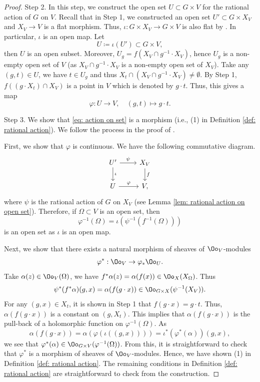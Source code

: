 \documentclass[11pt]{amsart}
\begin{document}
\begin{proof}
    \medskip

Step 2. In this step, we construct the open set $U \subset G \times V$ for the rational action of $G$ on $V$. Recall that in Step 1, we constructed an open set $U' \subset G \times X_{V}$ and $X_{V} \to V$ is a flat morphism. Thus, $\iota: G \times X_{V} \to G \times V$ is also flat by \cite[\href{https://stacks.math.columbia.edu/tag/01UA}{Lemma 01UA}]{stacks-project}. In particular, $\iota$ is an open map. Let
\[
U \coloneqq \iota(U') \subset G \times V,
\] then $U$ is an open subset. Moreover, $U_g= f (X_{V} \cap g^{-1}\cdot X_{V})$, hence $U_g$ is a non-empty open set of $V$ (as $X_{V} \cap g^{-1}\cdot X_{V}$ is a non-empty open set of $X_{V}$). Take any $(g, t)\in U$, we have $t\in U_g$ and thus $X_t \cap (X_{V} \cap g^{-1}\cdot X_{V}) \neq\emptyset$. By Step 1, $f((g\cdot X_t) \cap X_{V})$ is a point in $V$ which is denoted by $g\cdot t$. Thus, this gives a map
\begin{equation}\label{eq: action on set}
\varphi: U \to V, \quad (g, t) \mapsto g\cdot t.
\end{equation} 

Step 3. We show that \eqref{eq: action on set} is a morphism (i.e., (1) in Definition \ref{def: rational action}). We follow the process in the proof of \cite[Proposition 4.2.1]{BSU13}.

First, we show that $\varphi$ is continuous. We have the following commutative diagram.
\[
\begin{tikzcd}
U' \arrow{r}{\psi}\arrow{d}{\iota}& X_{V} \arrow{d}{f}\\
U \arrow{r}{\varphi}&V,
\end{tikzcd}
\] where $\psi$ is the rational action of $G$ on $X_{V}$ (see Lemma \ref{lem: rational action on open set}). Therefore, if $\Omega\subset V$ is an open set, then
\[
\varphi^{-1}(\Omega)= \iota\left(\psi^{-1}(f^{-1}(\Omega))\right)
\] is an open set as $\iota$ is an open map. 

Next, we show that there exists a natural morphism of sheaves of $\Oo_{V}$-modules
\[
\varphi^*: \Oo_{V} \to \varphi_*\Oo_{U}.
\] Take $\alpha(z) \in \Oo_V(\Omega)$, we have $f^*\alpha(z)=\alpha(f(x)) \in \Oo_X(X_\Omega)$. Thus
\[
\psi^*(f^*\alpha)(g,x)=\alpha(f(g\cdot x)) \in \Oo_{G \times X}(\psi^{-1}(X_{V})).
\] For any $(g, x) \in X_t$, it is shown in Step 1 that $f(g\cdot x) = g\cdot t$. Thus, $\alpha(f(g\cdot x))$ is a constant on $(g, X_t)$. This implies that $\alpha(f(g\cdot x))$ is the pull-back of a holomorphic function on $\varphi^{-1}(\Omega)$. As  
\[
\alpha(f(g\cdot x))=  \alpha(\varphi(\iota((g, x))))=\iota^*(\varphi^*(\alpha))(g,x),
\] we see that $\varphi^*(\alpha) \in \Oo_{G \times V}(\varphi^{-1}(\Omega))$. From this, it is straightforward to check that $\varphi^*$ is a morphism of sheaves of $\Oo_{V}$-modules. Hence, we have shown (1) in Definition \ref{def: rational action}. The remaining conditions in Definition \ref{def: rational action} are straightforward to check from the construction.
 \end{proof}
\end{document}
